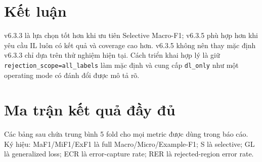 \documentclass[11pt,a4paper,twoside]{article}
\begin{document}
\section{Kết luận}
v6.3.3 là lựa chọn tốt hơn khi ưu tiên Selective Macro-F1; v6.3.5 phù hợp hơn khi yêu cầu IL luôn có kết quả và coverage cao hơn. v6.3.5 không nên thay mặc định v6.3.3 chỉ dựa trên thử nghiệm hiện tại. Cách triển khai hợp lý là giữ \texttt{rejection\_scope=all\_labels} làm mặc định và cung cấp \texttt{dl\_only} như một operating mode có đánh đổi được mô tả rõ.
\appendix
\section{Ma trận kết quả đầy đủ}
Các bảng sau chứa trung bình 5 fold cho mọi metric được dùng trong báo cáo. Ký hiệu: MaF1/MiF1/ExF1 là full Macro/Micro/Example-F1; S là selective; GL là generalized loss; ECR là error-capture rate; RER là rejected-region error rate.
\end{document}
